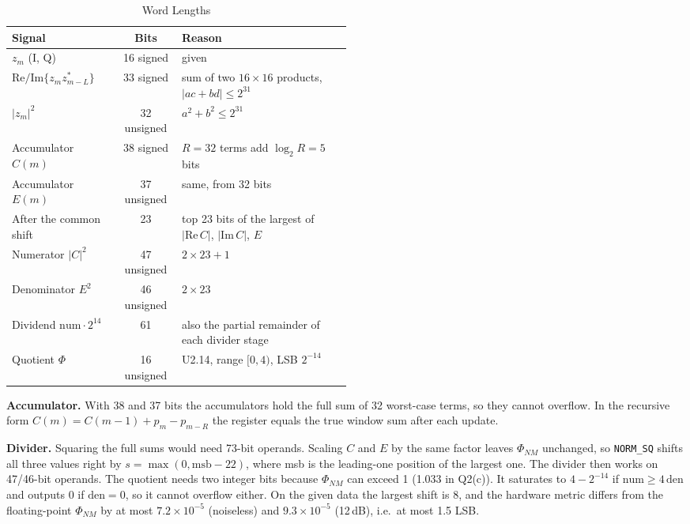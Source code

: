 \documentclass[12pt,a4paper]{report}
\begin{document}
\begin{table}[H]
\centering
\caption{Word Lengths}
\setlength{\tabcolsep}{8pt}
\renewcommand{\arraystretch}{1.25}
\begin{tabular}{l c >{\raggedright\arraybackslash}p{0.5\linewidth}}
\toprule
Signal & Bits & Reason \\
\midrule
$z_m$ (I, Q) & 16 signed & given \\
$\mathrm{Re}/\mathrm{Im}\{z_m z^*_{m-L}\}$ & 33 signed & sum of two $16 \times 16$ products, $|ac + bd| \le 2^{31}$ \\
$|z_m|^2$ & 32 unsigned & $a^2 + b^2 \le 2^{31}$ \\
Accumulator $C(m)$ & 38 signed & $R = 32$ terms add $\log_2 R = 5$ bits \\
Accumulator $E(m)$ & 37 unsigned & same, from 32 bits \\
After the common shift & 23 & top 23 bits of the largest of $|\mathrm{Re}\,C|$, $|\mathrm{Im}\,C|$, $E$ \\
Numerator $|C|^2$ & 47 unsigned & $2 \times 23 + 1$ \\
Denominator $E^2$ & 46 unsigned & $2 \times 23$ \\
Dividend $\mathrm{num} \cdot 2^{14}$ & 61 & also the partial remainder of each divider stage \\
Quotient $\Phi$ & 16 unsigned & U2.14, range $[0, 4)$, LSB $2^{-14}$ \\
\bottomrule
\end{tabular}
\end{table}

\textbf{Accumulator.} With 38 and 37 bits the accumulators hold the full sum of 32 worst-case terms, so they cannot
overflow. In the recursive form $C(m) = C(m-1) + p_m - p_{m-R}$ the register equals the true window sum after each
update.

\textbf{Divider.} Squaring the full sums would need 73-bit operands. Scaling $C$ and $E$ by the same factor leaves
$\Phi_{NM}$ unchanged, so \texttt{NORM\_SQ} shifts all three values right by $s = \max(0, \text{msb} - 22)$, where
msb is the leading-one position of the largest one. The divider then works on 47/46-bit operands. The quotient needs
two integer bits because $\Phi_{NM}$ can exceed 1 (1.033 in Q2(c)). It saturates to $4 - 2^{-14}$ if
$\mathrm{num} \ge 4\,\mathrm{den}$ and outputs 0 if $\mathrm{den} = 0$, so it cannot overflow either. On the given data
the largest shift is 8, and the hardware metric differs from the floating-point $\Phi_{NM}$ by at most
$7.2 \times 10^{-5}$ (noiseless) and $9.3 \times 10^{-5}$ (12\,dB), i.e.\ at most 1.5 LSB.
\end{document}
